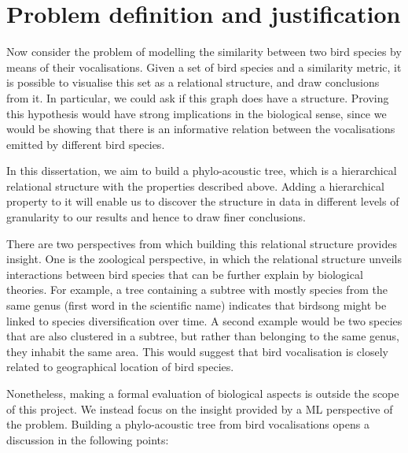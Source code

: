 \documentclass[../main.tex]{subfiles}
\begin{document}
\section{Problem definition and justification}
Now consider the problem of modelling the similarity between two bird species by means of their vocalisations. Given a set of bird species and a similarity metric, it is possible to visualise this set as a relational structure, and draw conclusions from it. In particular, we could ask if this graph does have a structure. Proving this hypothesis would have strong implications in the biological sense, since we would be showing that there is an informative relation between the vocalisations emitted by different bird species.
\par In this dissertation, we aim to build a phylo-acoustic tree, which is a hierarchical relational structure with the properties described above. Adding a hierarchical property to it will enable us to discover the structure in data in different levels of granularity to our results and hence to draw finer conclusions. 
\par There are two perspectives from which building this relational structure provides insight. One is the zoological perspective, in which the relational structure unveils interactions between bird species that can be further explain by biological theories. For example, a tree containing a subtree with mostly species from the same genus (first word in the scientific name) indicates that birdsong might be linked to species diversification over time. A second example would be two species that are also clustered in a subtree, but rather than belonging to the same genus, they inhabit the same area. This would suggest that bird vocalisation is closely related to geographical location of bird species.
\par Nonetheless, making a formal evaluation of biological aspects is outside the scope of this project. We instead focus on the insight provided by a ML perspective of the problem. Building a phylo-acoustic tree from bird vocalisations opens a discussion in the following points:
\end{document}
